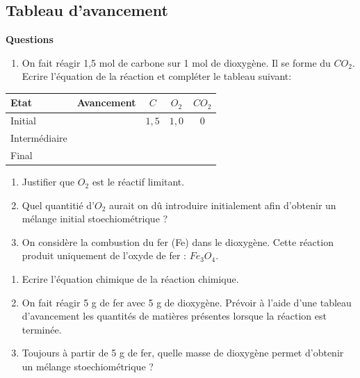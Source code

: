 \documentclass[
]{book}
\providecommand{\tightlist}{%
  \setlength{\itemsep}{0pt}\setlength{\parskip}{0pt}}
\def\tightlist{}
\begin{document}
\hypertarget{tableau-davancement}{%
\subsection{Tableau d'avancement}\label{tableau-davancement}}

\begin{blackbox}

\begin{center}
\textbf{Questions}

\end{center}

\begin{enumerate}
\def\labelenumi{\arabic{enumi}.}
\tightlist
\item
  On fait réagir 1,5 mol de carbone sur 1 mol de dioxygène. Il se forme du \(CO_2\). Ecrire l'équation de la réaction et compléter le tableau suivant:
\end{enumerate}

\begin{longtable}[]{@{}llccc@{}}
\toprule
Etat & Avancement & \(C\) & \(O_2\) & \(CO_2\) \\
\midrule
\endhead
Initial & & \(1,5\) & \(1,0\) & \(0\) \\
Intermédiaire & & & & \\
Final & & & & \\
\bottomrule
\end{longtable}

\begin{enumerate}
\def\labelenumi{\arabic{enumi}.}
\setcounter{enumi}{1}
\item
  Justifier que \(O_2\) est le réactif limitant.
\item
  Quel quantitié d'\(O_2\) aurait on dû introduire initialement afin d'obtenir un mélange initial stoechiométrique ?
\item
  On considère la combustion du fer (Fe) dans le dioxygène. Cette réaction produit uniquement de l'oxyde de fer : \(Fe_3O_4\).
\end{enumerate}

\begin{enumerate}
\def\labelenumi{\alph{enumi}.}
\tightlist
\item
  Ecrire l'équation chimique de la réaction chimique.
\item
  On fait réagir 5 g de fer avec 5 g de dioxygène. Prévoir à l'aide d'une tableau d'avancement les quantités de matières présentes lorsque la réaction est terminée.
\item
  Toujours à partir de 5 g de fer, quelle masse de dioxygène permet d'obtenir un mélange stoechiométrique ?
\end{enumerate}

\end{blackbox}
\end{document}
